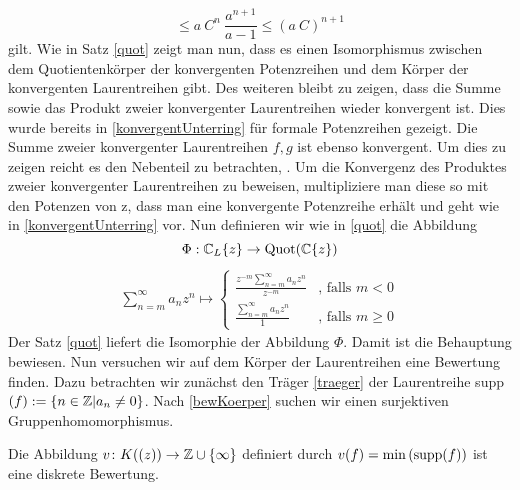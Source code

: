 {{\[ \le a~C^n~\frac{a^{n+1}}{a-1} \le \left(a~C\right)^{n+1}\]
 gilt.}
Wie in Satz \ref{quot} zeigt man nun, dass es einen Isomorphismus zwischen dem Quotientenkörper der konvergenten Potenzreihen und dem Körper der konvergenten Laurentreihen gibt. Des weiteren bleibt zu zeigen, dass die Summe sowie das Produkt zweier konvergenter Laurentreihen wieder konvergent ist. Dies wurde bereits in \ref{konvergentUnterring} für formale Potenzreihen gezeigt. Die Summe zweier konvergenter Laurentreihen $f,g $ ist ebenso konvergent. Um dies zu zeigen reicht es den Nebenteil zu betrachten, . Um die Konvergenz des Produktes zweier konvergenter Laurentreihen zu beweisen, multipliziere man diese so mit den Potenzen von z, dass man eine konvergente Potenzreihe erhält und geht wie in \ref{konvergentUnterring} vor.
Nun definieren wir wie in \ref{quot} die Abbildung 
\[\Phi:\mathbb{C}_L\lbrace z \rbrace \rightarrow \textup{Quot}(\mathbb{C} \lbrace z \rbrace ) \]
\begin{eqnarray} 
\sum_{n=m}^{\infty}a_nz^n  \mapsto 
\begin{cases}
\frac{{z^{-m}\sum_{n=m}^{\infty}a_nz^n}}{{z^{-m}}} & \text{, falls } m < 0 \\
\frac{\sum_{n=m}^{\infty}a_nz^n}{1} & \text{, falls } m\geq 0
\end{cases}
\end{eqnarray}
Der Satz \ref{quot} liefert die Isomorphie der Abbildung $\Phi$. Damit ist die Behauptung bewiesen.}
%
%
%
Nun versuchen wir auf dem Körper der Laurentreihen eine Bewertung finden.
Dazu betrachten wir zunächst den Träger \ref{traeger} der Laurentreihe supp$(f) := \lbrace n \in \mathbb{Z} | a_n \neq 0 \rbrace$. Nach \ref{bewKoerper} suchen wir einen surjektiven Gruppenhomomorphismus.
%
%
\begin{satz} \label{LaurentreiheBewertung}
Die Abbildung  $v\colon K((z))\rightarrow \mathbb{Z}\cup \lbrace \infty \rbrace$ definiert durch $v(f)= \min\left(\textup{supp}(f)\right)$ ist eine diskrete Bewertung.
\end{satz}
%
